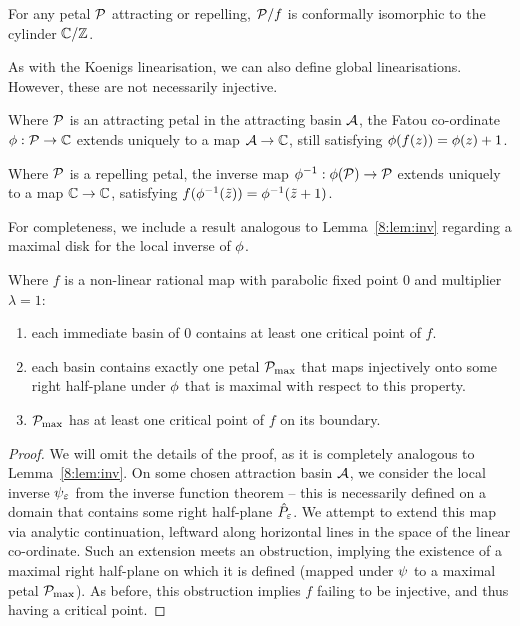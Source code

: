 \documentclass[../main.tex]{subfiles}
\begin{document}
\begin{cor}
    \label{10:cor:cyl}
    For any petal $\mathcal{P}$ attracting or repelling, $\mathcal{P}/f$ is conformally isomorphic to the cylinder $\mathbb{C}/\mathbb{Z}$.
\end{cor}

As with the Koenigs linearisation, we can also define global linearisations. However, these are not necessarily injective. 
\begin{cor}
    Where $\mathcal{P}$ is an attracting petal in the attracting basin $\mathcal{A}$, the Fatou co-ordinate $\phi:\mathcal{P}\to\mathbb{C}$ extends uniquely to a map $\mathcal{A}\to\mathbb{C}$, still satisfying $\phi(f(z))=\phi(z)+1$. 
\end{cor}
\begin{cor}
    Where $\mathcal{P}$ is a repelling petal, the inverse map ${\phi}^{-1}:\phi(\mathcal{P})\to\mathcal{P}$ extends uniquely to a map $\mathbb{C}\to\mathbb{C}$, satisfying $f({\phi}^{-1}(\tilde{z}))={\phi}^{-1}(\tilde{z}+1)$. 
\end{cor}

For completeness, we include a result analogous to Lemma~\ref{8:lem:inv} regarding a maximal disk for the local inverse of $\phi$.

\begin{lem}
    \label{10:lem:critical}
    Where $f$ is a non-linear rational map with parabolic fixed point 0 and multiplier $\lambda = 1$: 
    \begin{enumerate}
        \item each immediate basin of 0 contains at least one critical point of $f$.
        \item each basin contains exactly one petal $\mathcal{P}_\mathrm{max}$ that maps injectively onto some right half-plane under $\phi$ that is maximal with respect to this property. 
        \item $\mathcal{P}_\mathrm{max}$ has at least one critical point of $f$ on its boundary.
    \end{enumerate}
\end{lem}
\begin{proof}
    We will omit the details of the proof, as it is completely analogous to Lemma~\ref{8:lem:inv}. On some chosen attraction basin $\mathcal{A}$, we consider the local inverse $\psi_{\varepsilon}$ from the inverse function theorem -- this is necessarily defined on a domain that contains some right half-plane $\hat{P}_{\varepsilon}$. We attempt to extend this map via analytic continuation, leftward along horizontal lines in the space of the linear co-ordinate. Such an extension meets an obstruction, implying the existence of a maximal right half-plane on which it is defined (mapped under $\psi$ to a maximal petal $\mathcal{P}_\mathrm{max}$). As before, this obstruction implies $f$ failing to be injective, and thus having a critical point.
\end{proof}
\end{document}
